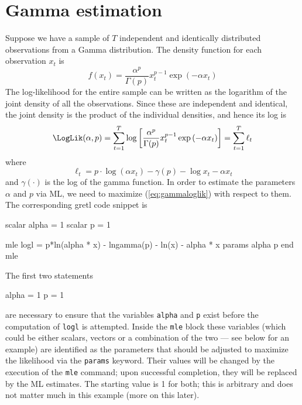 \section{Gamma estimation}
\label{sec:ml-gamma}

Suppose we have a sample of $T$ independent and identically
distributed observations from a Gamma distribution. The density
function for each observation $x_t$ is
\begin{equation}
  \label{eq:gammadens}
  f(x_t) = \frac{\alpha^p}{\Gamma(p)} x_t^{p-1} \exp\left({-\alpha
      x_t}\right)
\end{equation}
The log-likelihood for the entire sample can be written as the
logarithm of the joint density of all the observations. Since these
are independent and identical, the joint density is the product of the
individual densities, and hence its log is
\begin{equation}
  \label{eq:gammaloglik}
  \LogLik(\alpha, p) = \sum_{t=1}^T \log \left[ \frac{\alpha^p}{\Gamma(p)} x_t^{p-1} \exp\left({-\alpha
      x_t}\right) \right] = 
      \sum_{t=1}^T \ell_t
\end{equation}
where 
\[
  \ell_t = p \cdot \log (\alpha x_t) - \gamma(p) - \log x_t - \alpha x_t
\]
and $\gamma(\cdot)$ is the log of the gamma function.  In order to
estimate the parameters $\alpha$ and $p$ via ML, we need to maximize
(\ref{eq:gammaloglik}) with respect to them. The corresponding
gretl code snippet is

\begin{code}
scalar alpha = 1
scalar p = 1

mle logl =  p*ln(alpha * x) - lngamma(p) - ln(x) - alpha * x 
  params alpha p
end mle 
\end{code}

The first two statements

\begin{code}
alpha = 1
p = 1
\end{code}

are necessary to ensure that the variables \texttt{alpha} and
\texttt{p} exist before the computation of \texttt{logl} is
attempted. Inside the \texttt{mle} block these variables (which could
be either scalars, vectors or a combination of the two --- see below
for an example) are identified as the parameters that should be
adjusted to maximize the likelihood via the \texttt{params} keyword.
Their values will be changed by the execution of the \texttt{mle}
command; upon successful completion, they will be replaced by the ML
estimates. The starting value is 1 for both; this is arbitrary and
does not matter much in this example (more on this later).

